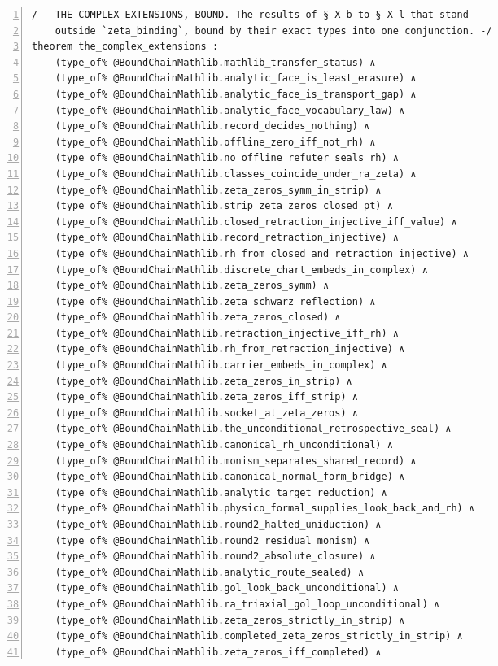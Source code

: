 \documentclass[10pt]{article}
\newcommand{\leansize}{\fontsize{5.5pt}{6.75pt}\selectfont}
\begin{document}
\begin{multicols}{2}
\begin{Verbatim}[numbers=left,firstnumber=1,numbersep=3pt,xleftmargin=2.6em,breaklines=true,breakanywhere=true,breakautoindent=false,breakindent=1.4em,breaksymbolleft={},breakanywheresymbolpre={},fontsize=\leansize]
/-- THE COMPLEX EXTENSIONS, BOUND. The results of § X-b to § X-l that stand
    outside `zeta_binding`, bound by their exact types into one conjunction. -/
theorem the_complex_extensions :
    (type_of% @BoundChainMathlib.mathlib_transfer_status) ∧
    (type_of% @BoundChainMathlib.analytic_face_is_least_erasure) ∧
    (type_of% @BoundChainMathlib.analytic_face_is_transport_gap) ∧
    (type_of% @BoundChainMathlib.analytic_face_vocabulary_law) ∧
    (type_of% @BoundChainMathlib.record_decides_nothing) ∧
    (type_of% @BoundChainMathlib.offline_zero_iff_not_rh) ∧
    (type_of% @BoundChainMathlib.no_offline_refuter_seals_rh) ∧
    (type_of% @BoundChainMathlib.classes_coincide_under_ra_zeta) ∧
    (type_of% @BoundChainMathlib.zeta_zeros_symm_in_strip) ∧
    (type_of% @BoundChainMathlib.strip_zeta_zeros_closed_pt) ∧
    (type_of% @BoundChainMathlib.closed_retraction_injective_iff_value) ∧
    (type_of% @BoundChainMathlib.record_retraction_injective) ∧
    (type_of% @BoundChainMathlib.rh_from_closed_and_retraction_injective) ∧
    (type_of% @BoundChainMathlib.discrete_chart_embeds_in_complex) ∧
    (type_of% @BoundChainMathlib.zeta_zeros_symm) ∧
    (type_of% @BoundChainMathlib.zeta_schwarz_reflection) ∧
    (type_of% @BoundChainMathlib.zeta_zeros_closed) ∧
    (type_of% @BoundChainMathlib.retraction_injective_iff_rh) ∧
    (type_of% @BoundChainMathlib.rh_from_retraction_injective) ∧
    (type_of% @BoundChainMathlib.carrier_embeds_in_complex) ∧
    (type_of% @BoundChainMathlib.zeta_zeros_in_strip) ∧
    (type_of% @BoundChainMathlib.zeta_zeros_iff_strip) ∧
    (type_of% @BoundChainMathlib.socket_at_zeta_zeros) ∧
    (type_of% @BoundChainMathlib.the_unconditional_retrospective_seal) ∧
    (type_of% @BoundChainMathlib.canonical_rh_unconditional) ∧
    (type_of% @BoundChainMathlib.monism_separates_shared_record) ∧
    (type_of% @BoundChainMathlib.canonical_normal_form_bridge) ∧
    (type_of% @BoundChainMathlib.analytic_target_reduction) ∧
    (type_of% @BoundChainMathlib.physico_formal_supplies_look_back_and_rh) ∧
    (type_of% @BoundChainMathlib.round2_halted_uniduction) ∧
    (type_of% @BoundChainMathlib.round2_residual_monism) ∧
    (type_of% @BoundChainMathlib.round2_absolute_closure) ∧
    (type_of% @BoundChainMathlib.analytic_route_sealed) ∧
    (type_of% @BoundChainMathlib.gol_look_back_unconditional) ∧
    (type_of% @BoundChainMathlib.ra_triaxial_gol_loop_unconditional) ∧
    (type_of% @BoundChainMathlib.zeta_zeros_strictly_in_strip) ∧
    (type_of% @BoundChainMathlib.completed_zeta_zeros_strictly_in_strip) ∧
    (type_of% @BoundChainMathlib.zeta_zeros_iff_completed) ∧

\end{Verbatim}
\end{multicols}
\end{document}
